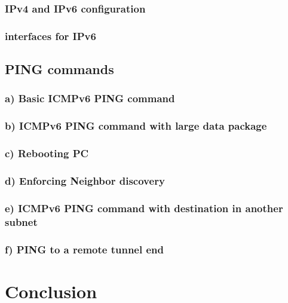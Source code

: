\subsection{IPv4 and IPv6 configuration}
\subsection{interfaces for IPv6}

\section{PING commands}
\subsection{a) Basic ICMPv6 PING command}
\subsection{b) ICMPv6 PING command with large data package}
\subsection{c) Rebooting PC}
\subsection{d) Enforcing Neighbor discovery}
\subsection{e) ICMPv6 PING command with destination in another subnet}
\subsection{f) PING to a remote tunnel end}

\chapter{Conclusion}
\label{conclusion}